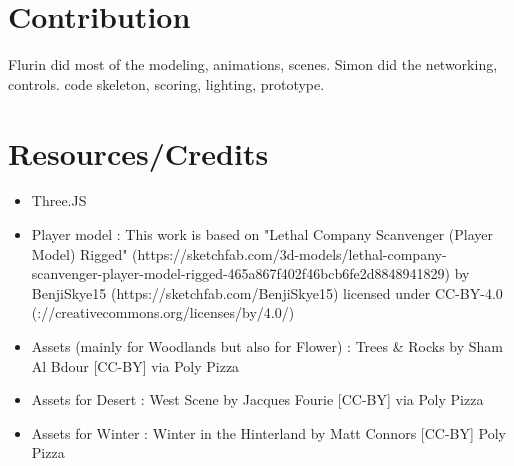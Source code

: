 \documentclass[11pt]{article}
\begin{document}
\section{Contribution}
Flurin did most of the modeling, animations, scenes. Simon did the networking, controls. code skeleton, scoring, lighting, prototype.



\section{Resources/Credits}
\begin{itemize}
	\item Three.JS
	\item Player model : This work is based on "Lethal Company Scanvenger (Player Model) Rigged" (https://sketchfab.com/3d-models/lethal-company-scanvenger-player-model-rigged-465a867f402f46bcb6fe2d8848941829) by BenjiSkye15 \newline (https://sketchfab.com/BenjiSkye15) licensed under CC-BY-4.0 \newline (\http://creativecommons.org/licenses/by/4.0/)
	\item Assets (mainly for Woodlands but also for Flower) : Trees & Rocks by Sham Al Bdour [CC-BY] via Poly Pizza 
	\item Assets for Desert :  \newlineWild West Scene by Jacques Fourie [CC-BY]  via Poly Pizza 
	\item Assets for Winter :  Winter in the Hinterland by Matt Connors [CC-BY] Poly Pizza 
\end{itemize}


\end{document}
